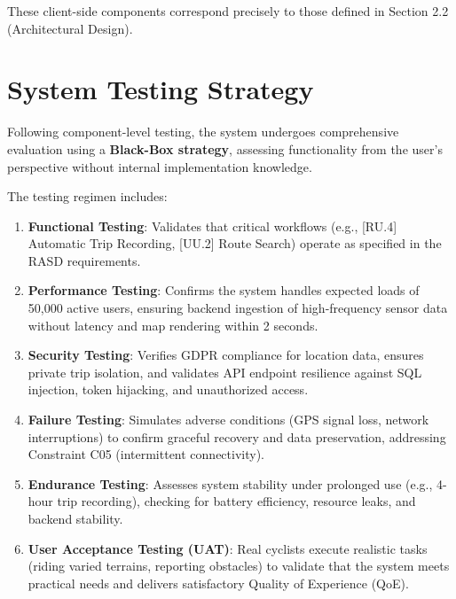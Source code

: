 These client-side components correspond precisely to those defined in Section 2.2 (Architectural Design).

\section{System Testing Strategy}
\label{sec:system-testing-strategy}

Following component-level testing, the system undergoes comprehensive evaluation using a \textbf{Black-Box strategy}, assessing functionality from the user's perspective without internal implementation knowledge.

The testing regimen includes:

\begin{enumerate}
    \item \textbf{Functional Testing}: Validates that critical workflows (e.g., [RU.4] Automatic Trip Recording, [UU.2] Route Search) operate as specified in the RASD requirements.
    
    \item \textbf{Performance Testing}: Confirms the system handles expected loads of 50,000 active users, ensuring backend ingestion of high-frequency sensor data without latency and map rendering within 2 seconds.
    
    \item \textbf{Security Testing}: Verifies GDPR compliance for location data, ensures private trip isolation, and validates API endpoint resilience against SQL injection, token hijacking, and unauthorized access.
    
    \item \textbf{Failure Testing}: Simulates adverse conditions (GPS signal loss, network interruptions) to confirm graceful recovery and data preservation, addressing Constraint C05 (intermittent connectivity).
    
    \item \textbf{Endurance Testing}: Assesses system stability under prolonged use (e.g., 4-hour trip recording), checking for battery efficiency, resource leaks, and backend stability.
    
    \item \textbf{User Acceptance Testing (UAT)}: Real cyclists execute realistic tasks (riding varied terrains, reporting obstacles) to validate that the system meets practical needs and delivers satisfactory Quality of Experience (QoE).
\end{enumerate}